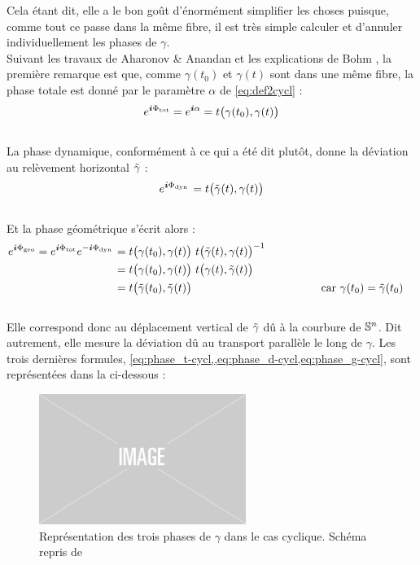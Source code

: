 Cela étant dit, elle a le bon goût d'énormément simplifier les choses puisque, comme tout ce passe dans la même fibre, il est très simple calculer et d'annuler individuellement les phases de $\gamma$. 
\\
Suivant les travaux de Aharonov \& Anandan \cite{aharonov_phase_1987} et les explications de Bohm \cite{bohm_geometric_2003}, la première remarque est que, comme $\gamma(t_0)$ et $\gamma(t)$ sont dans une même fibre, la phase totale est donné par le paramètre $\alpha$ de \eqref{eq:def2cycl} :
\begin{equation}\label{eq:phase_t-cycl}
	e^{\i \phaset} = e^{\i \alpha} = t\big( \gamma(t_0), \gamma(t) \big)
\end{equation}
\\
La phase dynamique, conformément à ce qui a été dit plutôt, donne la déviation au relèvement horizontal $\Tilde{\gamma}$ :
\begin{equation}\label{eq:phase_d-cycl}
	e^{\i \phased}= t\big( \Tilde{\gamma}(t), \gamma(t) \big)
\end{equation}
\\
Et la phase géométrique s'écrit alors :
\begin{equation}\label{eq:phase_g-cycl}
	\begin{aligned}
		e^{\i \phaseg}= e^{\i \phaset} e^{-\i \phased} &= t\big( \gamma(t_0), \gamma(t) \big)\ t\big( \Tilde{\gamma}(t), \gamma(t) \big)^{-1} \\
		&= t\big( \gamma(t_0), \gamma(t) \big)\ t\big( \gamma(t), \Tilde{\gamma}(t) \big) \\
		&= t\big( \Tilde{\gamma}(t_0), \Tilde{\gamma}(t) \big)  &  
		&&  &&  &&  && \text{car }\gamma(t_0) &= \Tilde{\gamma}(t_0)
	\end{aligned}
\end{equation}
\\
Elle correspond donc au déplacement vertical de $\Tilde{\gamma}$ dû à la courbure de $\S{n}$. Dit autrement, elle mesure la déviation dû au transport parallèle le long de $\gamma$. Les trois dernières formules, \cref{eq:phase_t-cycl,,eq:phase_d-cycl,eq:phase_g-cycl}, sont représentées dans la  ci-dessous : 
\\

\begin{figure}[h]
	\includegraphics[width=0.6\textwidth]{fig/placeholder}
	\caption[Représentation des trois phases de $\gamma$ dans le cas pseudo-cyclique]{Représentation des trois phases de $\gamma$ dans le cas cyclique. Schéma repris de \cite[fig. 4.1]{bohm_geometric_2003}}
	\label{fig:phases-cycl}
\end{figure}

